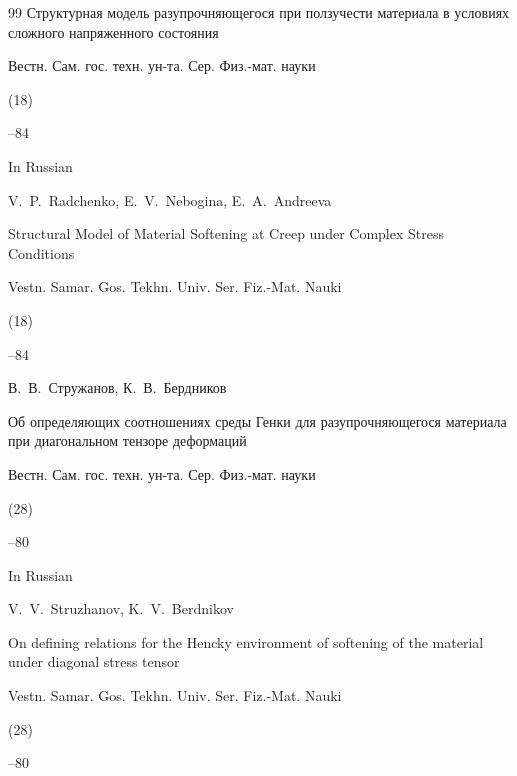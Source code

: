 \begin{thebibliography}{99}
\paper Структурная модель разупрочняющегося при ползучести материала в условиях сложного напряженного состояния

\jour Вестн. Сам. гос. техн. ун-та. Сер. Физ.-мат. науки


(18)

--84



\misctransl

\lang In Russian

\by V.~P.~Radchenko, E.~V.~Nebogina, E.~A.~Andreeva

\paper Structural Model of Material Softening at Creep under Complex Stress Conditions

\jour Vestn. Samar. Gos. Tekhn. Univ. Ser. Fiz.-Mat. Nauki


(18)

--84








\by В.~В.~Стружанов, К.~В.~Бердников

\paper Об определяющих соотношениях среды Генки для разупрочняющегося материала при диагональном тензоре деформаций

\jour Вестн. Сам. гос. техн. ун-та. Сер. Физ.-мат. науки


(28)

--80



\misctransl

\lang In Russian

\by V.~V.~Struzhanov, K.~V.~Berdnikov

\paper On defining relations for the Hencky environment of softening of the material under diagonal stress tensor

\jour Vestn. Samar. Gos. Tekhn. Univ. Ser. Fiz.-Mat. Nauki


(28)

--80






\end{thebibliography}
